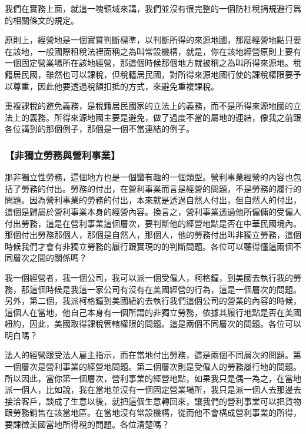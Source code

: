 \documentclass[oneside,sub3section]{ctexbook}
\begin{document}
我們在實務上面，就這一塊領域來講，我們並沒有很完整的一個防杜稅捐規避行爲的相關條文的規定。

原則上，經營地是一個實質判斷標準，以判斷所得的來源地國，那麼經營地點只要在該地，一般國際租稅法裡面稱之為叫常設機構，就是，你在該地經營原則上要有一個固定營業場所在該地經營，那這個時候那個地方就被稱之為叫所得來源地。稅籍居民國，雖然也可以課稅，但稅籍居民國，對所得來源地國行使的課稅權限要予以尊重，因此他要透過稅額扣抵的方式，來避免重複課稅。

重複課稅的避免義務，是稅籍居民國家的立法上的義務，而不是所得來源地國的立法上的義務。所得來源地國主要是避免，做了過度不當的屬地的連結，像我之前跟各位講到的那個例子，那個是一個不當連結的例子。

\hypertarget{ux975eux7368ux7acbux52deux52d9ux8207ux71dfux5229ux4e8bux696d}{%
\subsubsection{【非獨立勞務與營利事業】}\label{ux975eux7368ux7acbux52deux52d9ux8207ux71dfux5229ux4e8bux696d}}

那非獨立性勞務，這個地方也是一個蠻有趣的一個類型。營利事業經營的內容也包括了勞務的付出。勞務的付出，在營利事業而言是經營的問題，不是勞務的履行的問題。因為營利事業的勞務的付出，本來就是透過自然人付出，但自然人的付出，這個是歸屬於營利事業本身的經營內容。換言之，營利事業透過他所僱傭的受僱人付出勞務，這是在營利事業這個層次，要判斷他的經營地點是否在中華民國境內。那個付出勞務那個人，那個是自然人，那個人，他的勞務付出叫非獨立勞務，這個時候我們才會有非獨立勞務的履行跟實現的的判斷問題。各位可以聽得懂這兩個不同層次之間的關係嗎？

我一個經營者，我一個公司，我可以派一個受僱人，柯格鐘，到美國去執行我的勞務，那這個時候是我這一家公司有沒有在美國經營的行為，這是一個層次的問題。另外，第二個，我派柯格鐘到美國紐約去執行我們這個公司的營業的內容的時候，這個人在當地，他自己本身有一個所謂的非獨立勞務，依據其履行地點是否在美國紐約，因此，美國取得課稅管轄權限的問題。這是兩個不同層次的問題。各位可以明白嗎？

法人的經營跟受法人雇主指示，而在當地付出勞務，這是兩個不同層次的問題。第一個層次是營利事業的經營地問題。第二個層次則是受僱人的勞務履行地的問題。所以因此，當你第一個層次，營利事業的經營地點，如果我只是偶一為之，在當地派一個人，比如說，我在當地並沒有一個固定營業場所，我只是派一個人去那邊去接洽客戶，談成了生意以後，就把這個生意轉回來，讓我們的營利事業可以把貨物跟勞務銷售在該當地區。在當地沒有常設機構，從而他不會構成營利事業的所得，要課徵美國當地所得稅的問題。各位清楚嗎？
\end{document}

